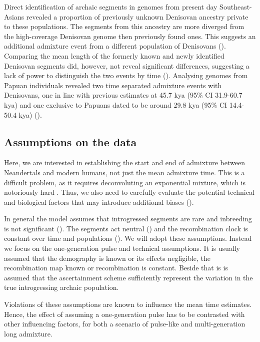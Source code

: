 \documentclass[]{article}
\begin{document}
Direct identification of archaic segments in genomes from present day Southeast-Asians revealed a proportion of previously unknown Denisovan ancestry private to these populations. The segments from this ancestry are more diverged from the high-coverage Denisovan genome then previously found ones. This suggests an additional admixture event from a different population of Denisovans (\cite{browning_analysis_2018}).
Comparing the mean length of the formerly known and newly identified Denisovan segments did, however, not reveal
significant differences, suggesting a lack of power to distinguish the
two events by time (\cite{browning_analysis_2018,jacobs_multiple_2019}).
Analysing genomes from Papuan individuals revealed two time separated
admixture events with Denisovans, one in line with previous estimates at
45.7 kya (95\% CI 31.9-60.7 kya) and one exclusive to Papuans dated to
be around 29.8 kya (95\% CI 14.4-50.4 kya)
(\cite{jacobs_multiple_2019}).

\subsection{Assumptions on the data}\label{assumptions-on-the-data}
Here, we are interested in establishing the start and end of admixture between Neandertals and modern humans, not just the mean admixture time. This is a difficult problem, as it requires deconvoluting an exponential mixture, which is notoriously hard . Thus, we also need to carefully evaluate the potential technical and biological factors that may introduce additional biases (\cite{pool_inference_2009,gravel_population_2012,liang_lengths_2014}).



In general the model assumes that introgressed segments are rare and inbreeding is not significant (\cite{pool_inference_2009}). The segments act neutral (\cite{shchur_distribution_2019}) and the recombination clock is constant over time and populations (\cite{gravel_population_2012}). We will adopt these assumptions. Instead we focus on the one-generation pulse and technical assumptions. It is usually assumed that the demography is known or its effects negligible, the recombination map known or recombination is constant. Beside that is is assumed that the ascertainment scheme sufficiently represent the variation in the true introgressing archaic population.

Violations of these assumptions are known to influence the mean time
estimates. Hence, the effect of assuming a one-generation pulse has to
be contrasted with other influencing factors, for both a scenario of
pulse-like and multi-generation long admixture. 
\end{document}
